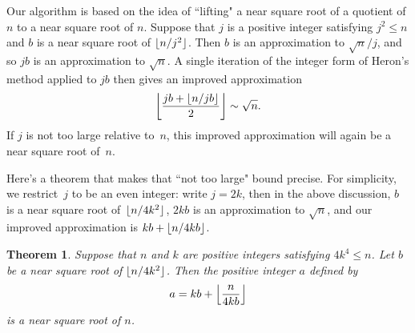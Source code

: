 \documentclass[a4paper]{article}
\DeclarePairedDelimiter\floor{\lfloor}{\rfloor}
\theoremstyle{plain}
\newtheorem{theorem}{Theorem}
\theoremstyle{definition}
\begin{document}
Our algorithm is based on the idea of ``lifting" a near square root of a
quotient of $n$ to a near square root of $n$. Suppose that $j$ is a positive
integer satisfying $j^2 \le n$ and $b$ is a near square root of $\floor{n /
j^2}$. Then $b$ is an approximation to $\sqrt n / j$, and so $jb$ is an
approximation to $\sqrt n$. A single iteration of the integer form of Heron's
method applied to $jb$ then gives an improved approximation
$$\floor*{\frac{jb + \floor{n / jb}}2} \sim \sqrt n.$$ If $j$ is not too large
relative to~$n$, this improved approximation will again be a near square root
of~$n$.

Here's a theorem that makes that ``not too large" bound precise. For
simplicity, we restrict~$j$ to be an even integer: write $j = 2k$, then in the
above discussion, $b$ is a near square root of~$\floor{n / 4k^2}$, $2kb$ is an
approximation to $\sqrt n$, and our improved approximation is $kb + \floor{n /
4kb}$.

\begin{theorem}\label{main_theorem}
  Suppose that $n$ and $k$ are positive integers satisfying $4k^4 \le n$. Let
  $b$ be a near square root of $\floor{n / 4k^2}$. Then the positive integer
  $a$ defined by
  $$a = kb + \floor*{\frac{n}{4kb}}$$
  is a near square root of $n$.
\end{theorem}
\end{document}
